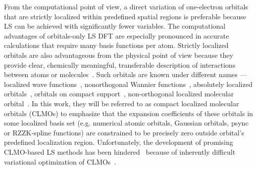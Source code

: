 \documentclass[aps,prl,twocolumn,reprint,amsmath,amssymb]{revtex4-1}
\begin{document}
From the computational point of view, a direct variation of one-electron orbitals that are strictly localized within predefined spatial regions is preferable because LS can be achieved with significantly fewer variables. %
The computational advantages of orbitals-only LS DFT are especially pronounced in accurate calculations that require many basis functions per atom. 
Strictly localized orbitals are also advantageous from the physical point of view because they provide clear, chemically meaningful, transferable description of interactions between atoms or molecules~\cite{RZZK-weitao, stoll1980use, khaliullin2007unravelling, khaliullin2008analysis}. 
%
Such orbitals are known under different names --- localized wave functions~\cite{ordejon1995linear}, nonorthogonal Wannier functions~\cite{weitao,RZZK}, absolutely localized orbitals~\cite{stoll1980use}, orbitals on compact support~\cite{RZZK}, non-orthogonal localized molecular orbital~\cite{weitao}. In this work, they will be referred to as compact localized molecular orbitals (CLMOs) to emphasize that the expansion coefficients of these orbitals in some localized basis set (e.g. numerical atomic orbitals, Gaussian orbitals, psync or RZZK-spline functions) are constrained to be precisely zero outside orbital's predefined localization region.
Unfortunately, the development of promising CLMO-based LS methods has been hindered~\cite{peng2013effective,tsuchida2008ab, fattebert-recent} because of inherently difficult variational optimization of CLMOs~\cite{mauri1993orbital,ordejon1995linear,goedecker1999linear, fattebert2004linear, peng2013effective, tsuchida2008ab, weitao-yang}. 
%
\end{document}
